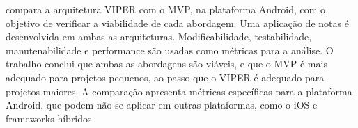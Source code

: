  compara a arquitetura VIPER com o MVP, na plataforma Android, com o objetivo de verificar a viabilidade de cada abordagem.
Uma aplicação de notas é desenvolvida em ambas as arquiteturas.
Modificabilidade, testabilidade, manutenabilidade e performance são usadas como métricas para a análise.
O trabalho conclui que ambas as abordagens são viáveis, e que o MVP é mais adequado para projetos pequenos, ao passo que o VIPER é adequado para projetos maiores.
A comparação apresenta métricas específicas para a plataforma Android, que podem não se aplicar em outras plataformas, como o iOS e frameworks híbridos.